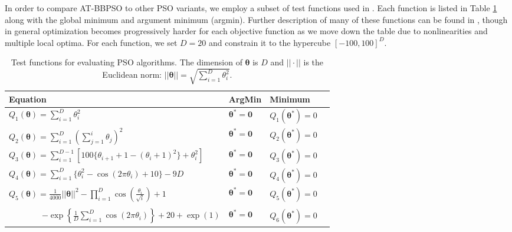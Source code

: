 \documentclass[cmbright]{staauth}
\begin{document}
In order to compare AT-BBPSO to other PSO variants, we employ a subset of test functions used in \cite{hsieh2010modified}. Each function is listed in Table \ref{tab:testfuns} along with the global minimum and argument minimum (argmin). Further description of many of these functions can be found in \cite{clerc2010particle}, though in general optimization becomes progressively harder for each objective function as we move down the table due to nonlinearities and multiple local optima. For each function, we set $D=20$ and constrain it to the hypercube $[-100, 100]^D$.

\begin{table}[p]
\centering
\begin{tabular}{llll}
 Equation & ArgMin & Minimum \\\hline
 $Q_1(\bm{\theta}) = \sum_{i=1}^D\theta_i^2$ & $\bm{\theta}^* = \bm{0}$ & $Q_1(\bm{\theta}^*) = 0$  \\
 $Q_2(\bm{\theta}) = \sum_{i=1}^D\left(\sum_{j=1}^i \theta_j\right)^2 $ & $\bm{\theta}^* = \bm{0}$ & $Q_2(\bm{\theta}^*) = 0$ \\
 $Q_3(\bm{\theta}) = \sum_{i=1}^{D-1}\left[100\{\theta_{i+1} + 1 - (\theta_i + 1)^2\} + \theta_i^2\right]$ & $\bm{\theta}^* = \bm{0}$ & $Q_3(\bm{\theta}^*) = 0$ \\
 $Q_4(\bm{\theta}) = \sum_{i=1}^D\{\theta_i^2 - \cos(2\pi \theta_i) + 10\} - 9D$ & $\bm{\theta}^*=\bm{0}$ & $Q_4(\bm{\theta}^*) = 0$ \\
 $Q_5(\bm{\theta}) = \frac{1}{4000}||\bm{\theta}||^2 - \prod_{i=1}^D\cos\left(\frac{\theta_i}{\sqrt{i}}\right) + 1$ & $\bm{\theta}^* = \bm{0}$ & $Q_5(\bm{\theta}^*) = 0$ \\
 \shortstack[l]{$Q_6(\bm{\theta}) = -20\exp\left(-0.2\sqrt{\frac{1}{D}||\bm{\theta}||}\right)$ \\ \ \ \ \ \ \ \ \ $- \exp\left\{\frac{1}{D}\sum_{i=1}^D\cos(2\pi \theta_i)\right\} + 20 + \exp(1)$} & $\bm{\theta}^* = \bm{0}$ & $Q_6(\bm{\theta}^*) = 0$ \\\hline
\end{tabular}
\caption{Test functions for evaluating PSO algorithms. The dimension of $\bm{\theta}$ is $D$ and $||\cdot||$ is the Euclidean norm: $||\bm{\theta}|| = \sqrt{\sum_{i=1}^D\theta_i^2}$.}
\label{tab:testfuns}
\end{table}
\end{document}
